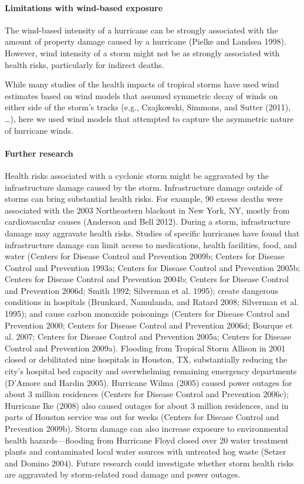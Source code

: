 \documentclass[]{elsarticle} %
\begin{document}
\paragraph{Limitations with wind-based
exposure}\label{limitations-with-wind-based-exposure}

The wind-based intensity of a hurricane can be strongly associated with
the amount of property damage caused by a hurricane (Pielke and Landsea
1998). However, wind intensity of a storm might not be as strongly
associated with health risks, particularly for indirect deaths.

While many studies of the health impacts of tropical storms have used
wind estimates based on wind models that assumed symmetric decay of
winds on either side of the storm's tracks (e.g., Czajkowski, Simmons,
and Sutter (2011), \ldots{}), here we used wind models that attempted to
capture the asymmetric nature of hurricane winds.

\paragraph{Further research}\label{further-research}

Health risks associated with a cyclonic storm might be aggravated by the
infrastructure damage caused by the storm. Infrastructure damage outside
of storms can bring substantial health risks. For example, 90 excess
deaths were associated with the 2003 Northeastern blackout in New York,
NY, mostly from cardiovascular causes (Anderson and Bell 2012). During a
storm, infrastructure damage may aggravate health risks. Studies of
specific hurricanes have found that infrastructure damage can limit
access to medications, health facilities, food, and water (Centers for
Disease Control and Prevention 2009b; Centers for Disease Control and
Prevention 1993a; Centers for Disease Control and Prevention 2005b;
Centers for Disease Control and Prevention 2004b; Centers for Disease
Control and Prevention 2006d; Smith 1992; Silverman et al. 1995); create
dangerous conditions in hospitals (Brunkard, Namulanda, and Ratard 2008;
Silverman et al. 1995); and cause carbon monoxide poisonings (Centers
for Disease Control and Prevention 2000; Centers for Disease Control and
Prevention 2006d; Bourque et al. 2007; Centers for Disease Control and
Prevention 2005a; Centers for Disease Control and Prevention 2009a).
Flooding from Tropical Storm Allison in 2001 closed or debilitated nine
hospitals in Houston, TX, substantially reducing the city's hospital bed
capacity and overwhelming remaining emergency departments (D'Amore and
Hardin 2005). Hurricane Wilma (2005) caused power outages for about 3
million residences (Centers for Disease Control and Prevention 2006c);
Hurricane Ike (2008) also caused outages for about 3 million residences,
and in parts of Houston service was out for weeks (Centers for Disease
Control and Prevention 2009b). Storm damage can also increase exposure
to environmental health hazards---flooding from Hurricane Floyd closed
over 20 water treatment plants and contaminated local water sources with
untreated hog waste (Setzer and Domino 2004). Future research could
investigate whether storm health risks are aggravated by storm-related
road damage and power outages.
\end{document}

